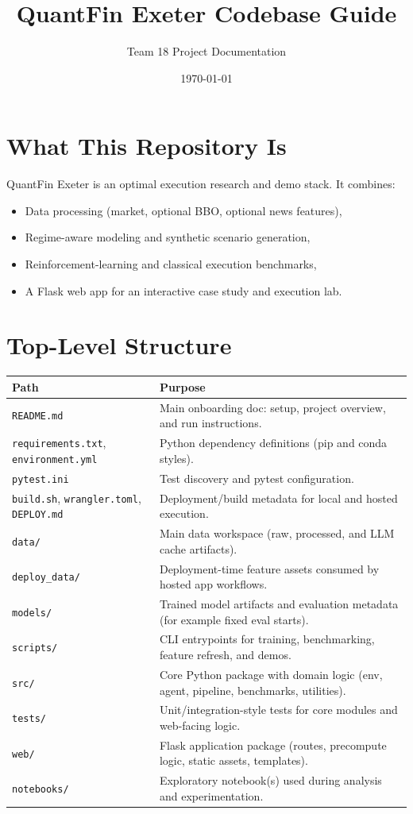 \documentclass[11pt]{article}
\title{QuantFin Exeter Codebase Guide}
\author{Team 18 Project Documentation}
\date{\today}
\begin{document}
\maketitle

\section{What This Repository Is}
QuantFin Exeter is an optimal execution research and demo stack. It combines:
\begin{itemize}[leftmargin=1.2em]
    \item Data processing (market, optional BBO, optional news features),
    \item Regime-aware modeling and synthetic scenario generation,
    \item Reinforcement-learning and classical execution benchmarks,
    \item A Flask web app for an interactive case study and execution lab.
\end{itemize}

\section{Top-Level Structure}
\begin{longtable}{>{\raggedright\arraybackslash}p{} >{\raggedright\arraybackslash}p{}}
\textbf{Path} & \textbf{Purpose} \\
\hline
\texttt{README.md} & Main onboarding doc: setup, project overview, and run instructions. \\
\texttt{requirements.txt}, \texttt{environment.yml} & Python dependency definitions (pip and conda styles). \\
\texttt{pytest.ini} & Test discovery and pytest configuration. \\
\texttt{build.sh}, \texttt{wrangler.toml}, \texttt{DEPLOY.md} & Deployment/build metadata for local and hosted execution. \\
\texttt{data/} & Main data workspace (raw, processed, and LLM cache artifacts). \\
\texttt{deploy\_data/} & Deployment-time feature assets consumed by hosted app workflows. \\
\texttt{models/} & Trained model artifacts and evaluation metadata (for example fixed eval starts). \\
\texttt{scripts/} & CLI entrypoints for training, benchmarking, feature refresh, and demos. \\
\texttt{src/} & Core Python package with domain logic (env, agent, pipeline, benchmarks, utilities). \\
\texttt{tests/} & Unit/integration-style tests for core modules and web-facing logic. \\
\texttt{web/} & Flask application package (routes, precompute logic, static assets, templates). \\
\texttt{notebooks/} & Exploratory notebook(s) used during analysis and experimentation. \\
\end{longtable}
\end{document}
